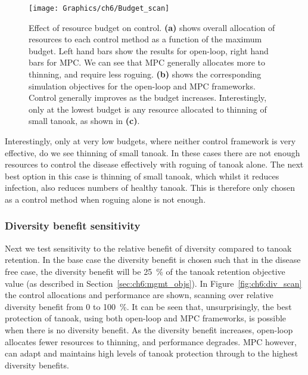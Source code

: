 \begin{figure}
    \begin{center}
        \texttt{[image: Graphics/ch6/Budget\_scan]}
        \caption[Varying the control budget]{Effect of resource budget on control. \textbf{(a)} shows overall allocation of resources to each control method as a function of the maximum budget. Left hand bars show the results for open-loop, right hand bars for MPC\@. We can see that MPC generally allocates more to thinning, and require less roguing. \textbf{(b)} shows the corresponding simulation objectives for the open-loop and MPC frameworks. Control generally improves as the budget increases. Interestingly, only at the lowest budget is any resource allocated to thinning of small tanoak, as shown in \textbf{(c)}.\label{fig:ch6:budget_scan}}
    \end{center}
\end{figure}

Interestingly, only at very low budgets, where neither control framework is very effective, do we see thinning of small tanoak. In these cases there are not enough resources to control the disease effectively with roguing of tanoak alone. The next best option in this case is thinning of small tanoak, which whilst it reduces infection, also reduces numbers of healthy tanoak. This is therefore only chosen as a control method when roguing alone is not enough.

\subsubsection{Diversity benefit sensitivity}\label{sec:ch6:div_scan}

Next we test sensitivity to the relative benefit of diversity compared to tanoak retention. In the base case the diversity benefit is chosen such that in the disease free case, the diversity benefit will be \SI{25}{\percent} of the tanoak retention objective value (as described in Section~\ref{sec:ch6:mgmt_objs}). In Figure~\ref{fig:ch6:div_scan} the control allocations and performance are shown, scanning over relative diversity benefit from 0 to \SI{100}{\percent}. It can be seen that, unsurprisingly, the best protection of tanoak, using both open-loop and MPC frameworks, is possible when there is no diversity benefit. As the diversity benefit increases, open-loop allocates fewer resources to thinning, and performance degrades. MPC however, can adapt and maintains high levels of tanoak protection through to the highest diversity benefits.

